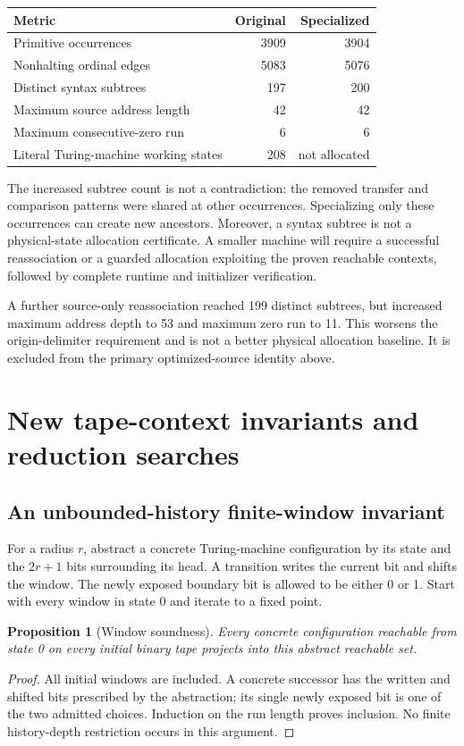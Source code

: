 \documentclass[11pt,a4paper]{article}
\newtheorem{proposition}[theorem]{Proposition}
\theoremstyle{definition}
\begin{document}
\begin{center}
\begin{tabular}{@{}lrr@{}}
\toprule
Metric & Original & Specialized\\
\midrule
Primitive occurrences & 3909 & 3904\\
Nonhalting ordinal edges & 5083 & 5076\\
Distinct syntax subtrees & 197 & 200\\
Maximum source address length & 42 & 42\\
Maximum consecutive-zero run & 6 & 6\\
Literal Turing-machine working states & 208 & not allocated\\
\bottomrule
\end{tabular}
\end{center}
The increased subtree count is not a contradiction: the removed transfer and comparison patterns were shared at other occurrences. Specializing only these occurrences can create new ancestors. Moreover, a syntax subtree is not a physical-state allocation certificate. A smaller machine will require a successful reassociation or a guarded allocation exploiting the proven reachable contexts, followed by complete runtime and initializer verification.

A further source-only reassociation reached 199 distinct subtrees, but increased maximum address depth to 53 and maximum zero run to 11. This worsens the origin-delimiter requirement and is not a better physical allocation baseline. It is excluded from the primary optimized-source identity above.

\section{New tape-context invariants and reduction searches}
\label{sec:searches}

\subsection{An unbounded-history finite-window invariant}

For a radius $r$, abstract a concrete Turing-machine configuration by its state and the $2r+1$ bits surrounding its head. A transition writes the current bit and shifts the window. The newly exposed boundary bit is allowed to be either 0 or 1. Start with every window in state 0 and iterate to a fixed point.

\begin{proposition}[Window soundness]
Every concrete configuration reachable from state 0 on every initial binary tape projects into this abstract reachable set.
\end{proposition}
\begin{proof}
All initial windows are included. A concrete successor has the written and shifted bits prescribed by the abstraction; its single newly exposed bit is one of the two admitted choices. Induction on the run length proves inclusion. No finite history-depth restriction occurs in this argument.
\end{proof}
\end{document}

